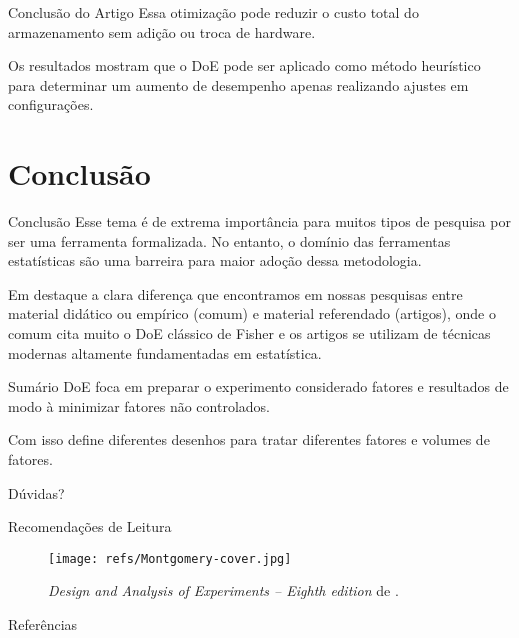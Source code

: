 \documentclass[aspectratio=43,10pt]{beamer}
\begin{document}
\begin{frame}{Conclusão do Artigo}
  \justifying Essa otimização pode reduzir o custo total do armazenamento sem adição ou troca de hardware.
  \vspace{0.5cm}

  Os resultados mostram que o DoE pode ser aplicado como método heurístico para determinar um aumento de desempenho apenas realizando ajustes em configurações.
\end{frame}

\section{Conclusão}

\begin{frame}{Conclusão}
    Esse tema é de extrema importância para muitos tipos de pesquisa por ser uma ferramenta
    formalizada. No entanto, o domínio das ferramentas estatísticas são uma barreira
    para maior adoção dessa metodologia.
    
    Em destaque a clara diferença que encontramos em nossas pesquisas entre material didático ou empírico (comum)
    e material referendado (artigos), onde o comum cita muito o DoE clássico de Fisher e os artigos 
    se utilizam de técnicas modernas altamente fundamentadas em estatística.
\end{frame}

\begin{frame}{Sumário}
    DoE foca em preparar o experimento considerado fatores e resultados de modo à minimizar fatores não controlados.
    
    Com isso define diferentes desenhos para tratar diferentes fatores e volumes de fatores.
\end{frame}

{\begin{frame}[standout]
  Dúvidas?
\end{frame}}

\appendix

\begin{frame}[fragile]{Recomendações de Leitura}
   \begin{figure}
      \centering
      \texttt{[image: refs/Montgomery-cover.jpg]}
      \caption{\textit{Design and Analysis of Experiments -- Eighth edition} de .}
    \end{figure}
\end{frame}

\begin{frame}[allowframebreaks]{Referências}
  
\end{frame}
\end{document}
